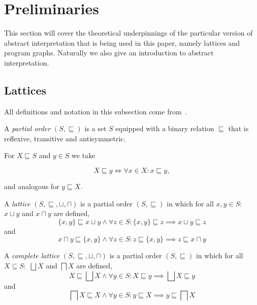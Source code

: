
\section{Preliminaries}\label{sec:preliminaries}
This section will cover the theoretical underpinnings of the particular version of abstract interpretation that is being used in this paper, namely lattices and program graphs.
Naturally we also give an introduction to abstract interpretation.

\subsection{Lattices}\label{subsec:lattices}
All definitions and notation in this subsection come from~\cite{moller_statitc_nodate}.


\begin{definition}
    A \emph{partial order} $(S, \sqsubseteq)$ is a set $S$ equipped with a binary relation $\sqsubseteq$ that is reflexive, transitive and antisymmetric.
\end{definition}


For $X \sqsubseteq S$ and $y \in S$ we take


\begin{equation}
    X \sqsubseteq y \iff \forall x \in X : x \sqsubseteq y,\label{eq:equation}
\end{equation}


and analogous for $y \sqsubseteq X$.


\begin{definition}
    A \emph{lattice} $(S, \sqsubseteq, \sqcup, \sqcap)$ is a partial order $(S, \sqsubseteq)$ in which for all $x,y \in S:$ $x \sqcup y$ and $x \sqcap y$ are defined,
    \begin{equation}
        \{x, y\} \sqsubseteq x \sqcup y \land \forall z \in S : \{x, y\} \sqsubseteq z \implies x \sqcup y \sqsubseteq z\label{eq:equation4}
    \end{equation}
    and
    \begin{equation}
        x \sqcap y \sqsubseteq \{x, y\} \land \forall z \in S : z \sqsubseteq \{x, y\} \implies z \sqsubseteq x \sqcap y\label{eq:equation5}
    \end{equation}
\end{definition}


\begin{definition}
    A \emph{complete lattice} $(S, \sqsubseteq, \sqcup, \sqcap)$ is a partial order $(S, \sqsubseteq)$ in which for all $X \subseteq S:$ $\bigsqcup X$ and $\bigsqcap X$ are defined,
    \begin{equation}
        X \sqsubseteq \bigsqcup X \land \forall y \in S : X \sqsubseteq y \implies \bigsqcup X \sqsubseteq y\label{eq:equation2}
    \end{equation}
    and
    \begin{equation}
        \bigsqcap X \sqsubseteq X \land \forall y \in S : y \sqsubseteq X \implies y \sqsubseteq \bigsqcap X\label{eq:equation3}
    \end{equation}
\end{definition}


